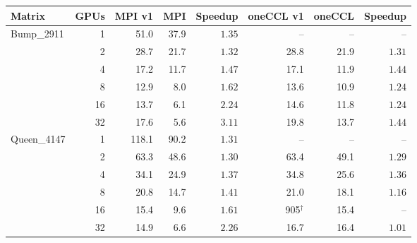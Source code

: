 \begin{tabular}{lrrrrrrr}
\toprule
Matrix & GPUs & MPI v1 & MPI & Speedup & oneCCL v1 & oneCCL & Speedup\\
\midrule
Bump\_2911 & 1 & 51.0 & 37.9 & $1.35$ & -- & -- & --\\
 & 2 & 28.7 & 21.7 & $1.32$ & 28.8 & 21.9 & $1.31$\\
 & 4 & 17.2 & 11.7 & $1.47$ & 17.1 & 11.9 & $1.44$\\
 & 8 & 12.9 & 8.0 & $1.62$ & 13.6 & 10.9 & $1.24$\\
 & 16 & 13.7 & 6.1 & $2.24$ & 14.6 & 11.8 & $1.24$\\
 & 32 & 17.6 & 5.6 & $3.11$ & 19.8 & 13.7 & $1.44$\\
\midrule
Queen\_4147 & 1 & 118.1 & 90.2 & $1.31$ & -- & -- & --\\
 & 2 & 63.3 & 48.6 & $1.30$ & 63.4 & 49.1 & $1.29$\\
 & 4 & 34.1 & 24.9 & $1.37$ & 34.8 & 25.6 & $1.36$\\
 & 8 & 20.8 & 14.7 & $1.41$ & 21.0 & 18.1 & $1.16$\\
 & 16 & 15.4 & 9.6 & $1.61$ & 905$^\dagger$ & 15.4 & --\\
 & 32 & 14.9 & 6.6 & $2.26$ & 16.7 & 16.4 & $1.01$\\
\bottomrule
\end{tabular}
